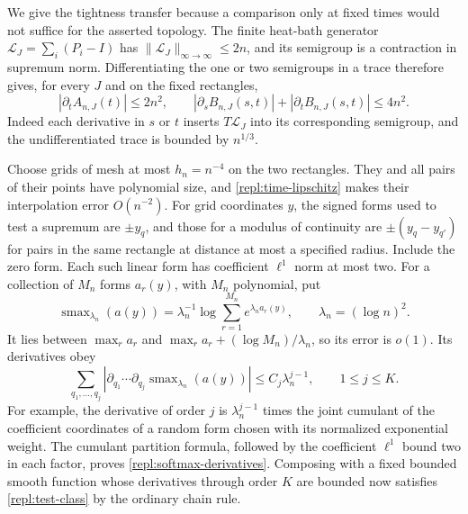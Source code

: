 We give the tightness transfer because a comparison only at fixed times
would not suffice for the asserted topology.  The finite heat-bath
generator $\mathcal L_J=\sum_i(P_i-I)$ has
$\|\mathcal L_J\|_{\infty\to\infty}\le2n$, and its semigroup is a
contraction in supremum norm.  Differentiating the one or two semigroups
in a trace therefore gives, for every $J$ and on the fixed rectangles,
\begin{equation}\label{repl:time-lipschitz}
 |\partial_t A_{n,J}(t)|\le2n^2,\qquad
 |\partial_s B_{n,J}(s,t)|+|\partial_t B_{n,J}(s,t)|\le4n^2.
\end{equation}
Indeed each derivative in $s$ or $t$ inserts $T\mathcal L_J$ into its
corresponding semigroup, and the undifferentiated trace is bounded by $n^{1/3}$.

Choose grids of mesh at most $h_n=n^{-4}$ on the two rectangles.  They and
all pairs of their points have polynomial size, and
\eqref{repl:time-lipschitz} makes their interpolation error $O(n^{-2})$.
For grid coordinates $y$, the signed forms used to test a supremum are
$\pm y_q$, and those for a modulus of continuity are
$\pm(y_q-y_{q'})$ for pairs in the same rectangle at distance at most
a specified radius.  Include the zero form.  Each such linear form has
coefficient $\ell^1$ norm at most two.  For a collection of $M_n$ forms
$a_r(y)$, with $M_n$ polynomial, put
\[
 \operatorname{smax}_{\lambda_n}(a(y))
 =\lambda_n^{-1}\log\sum_{r=1}^{M_n}e^{\lambda_n a_r(y)},
 \qquad \lambda_n=(\log n)^2.
\]
It lies between $\max_r a_r$ and
$\max_r a_r+(\log M_n)/\lambda_n$, so its error is $o(1)$.
Its derivatives obey
\begin{equation}\label{repl:softmax-derivatives}
 \sum_{q_1,\ldots,q_j}
 \left|\partial_{q_1}\cdots\partial_{q_j}
      \operatorname{smax}_{\lambda_n}(a(y))\right|
 \le C_j\lambda_n^{j-1},\qquad 1\le j\le K.
\end{equation}
For example, the derivative of order $j$ is $\lambda_n^{j-1}$ times
the joint cumulant of the coefficient coordinates of a random form chosen
with its normalized exponential weight.  The cumulant partition formula,
followed by the coefficient $\ell^1$ bound two in each factor, proves
\eqref{repl:softmax-derivatives}.  Composing with a fixed bounded smooth
function whose derivatives through order $K$ are bounded now satisfies
\eqref{repl:test-class} by the ordinary chain rule.

